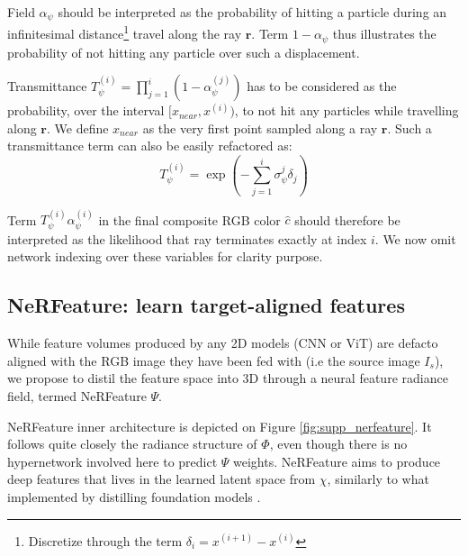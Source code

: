 Field $\alpha_{\psi}$ should be interpreted as the probability of hitting a particle during an infinitesimal distance\footnote{Discretize through the term $\delta_{i} = x^{(i+1)} - x^{(i)}$} travel  along the ray $\mathbf{r}$. Term $ 1 - \alpha_{\psi}$ thus illustrates the probability of not hitting any particle over such a displacement. 

Transmittance $T_{\psi}^{(i)} = \prod_{j=1}^{i}(1-\alpha_{\psi}^{(j)})$ has to be considered as the probability, over the interval $[x_{near},x^{(i)})$, to not hit any particles while travelling along $\mathbf{r}$. We define $x_{near}$ as the very first point sampled along a ray $\mathbf{r}$. Such a transmittance term can also be easily refactored as: 
\begin{equation}
T_{\psi}^{(i)} = \exp\left( - \sum_{j=1}^{i}\sigma_{\psi}^{j}\delta_{j}\right)
\end{equation}

Term $T_{\psi}^{(i)}\alpha_{\psi}^{(i)}$ in the final composite RGB color $\hat{c}$ should therefore be interpreted as the likelihood that ray terminates exactly at index $i$.  We now omit network indexing over these variables for clarity purpose.

\subsection{NeRFeature: learn target-aligned features}
\label{subsec:nerfeature}

While feature volumes produced by any 2D models (CNN or ViT) are defacto aligned with the RGB image they have been fed with (i.e the source image $I_s$), we propose to distil the feature space into 3D through a neural feature radiance field, termed NeRFeature $\Psi$. 

NeRFeature inner architecture is depicted on Figure \ref{fig:supp_nerfeature}. It follows quite closely the radiance structure of $\Phi$, even though there is no hypernetwork involved here to predict $\Psi$ weights. NeRFeature aims to produce deep features that lives in the learned latent space from $\chi$, similarly to what \cite{ye2023featurenerf} implemented by distilling foundation models \cite{oquab2023dinov2}.

